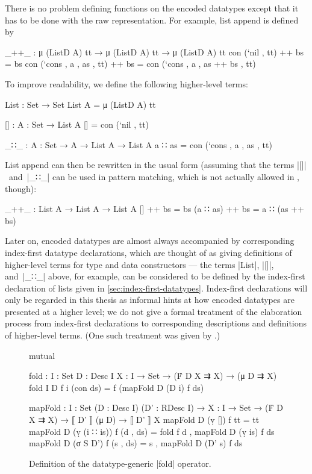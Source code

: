 
There is no problem defining functions on the encoded datatypes except that it has to be done with the raw representation.
For example, list append is defined by
\begin{code}
_++_ : μ (ListD A) tt → μ (ListD A) tt → μ (ListD A) tt
con (`nil   ,           tt) ++ bs = bs
con (`cons  , a , as ,  tt) ++ bs = con (`cons , a , as ++ bs , tt)
\end{code}
To improve readability, we define the following higher-level terms:
\begin{code}
List : Set → Set
List A = μ (ListD A) tt

[] : {A : Set} → List A
[] = con (`nil , tt)

_∷_ : {A : Set} → A → List A → List A
a ∷ as = con (`cons  , a , as ,  tt)
\end{code}
List append can then be rewritten in the usual form (assuming that the terms |[]|~and~|_∷_| can be used in pattern matching, which is not actually allowed in \Agda, though):
\begin{code}
_++_ : List A → List A → List A
[]        ++ bs = bs
(a ∷ as)  ++ bs = a ∷ (as ++ bs)
\end{code}
Later on, encoded datatypes are almost always accompanied by corresponding index-first datatype declarations, which are thought of as giving definitions of higher-level terms for type and data constructors --- the terms |List|, |[]|, and~|_∷_| above, for example, can be considered to be defined by the index-first declaration of lists given in \autoref{sec:index-first-datatypes}.
Index-first declarations will only be regarded in this thesis as informal hints at how encoded datatypes are presented at a higher level; we do not give a formal treatment of the elaboration process from index-first declarations to corresponding descriptions and definitions of higher-level terms.
(One such treatment was given by \citet{Dagand-elaboration}.)

\begin{figure}
\codefigure
\begin{code}
mutual

  fold : {I : Set} {D : Desc I} {X : I → Set} → (Ḟ D X ⇉ X) → (μ D ⇉ X)
  fold {I} {D} f {i} (con ds) = f (mapFold D (D i) f ds)

  mapFold :  {I : Set} (D : Desc I) (D' : RDesc I) →
             {X : I → Set} → (Ḟ D X ⇉ X) → ⟦ D' ⟧ (μ D) → ⟦ D' ⟧ X
  mapFold D (ṿ [])        f tt         = tt
  mapFold D (ṿ (i ∷ is))  f (d  , ds)  = fold f d , mapFold D (ṿ is) f ds
  mapFold D (σ S D')      f (s  , ds)  = s , mapFold D (D' s) f ds
\end{code}
\caption{Definition of the datatype-generic |fold| operator.}
\label{fig:fold}
\end{figure}

